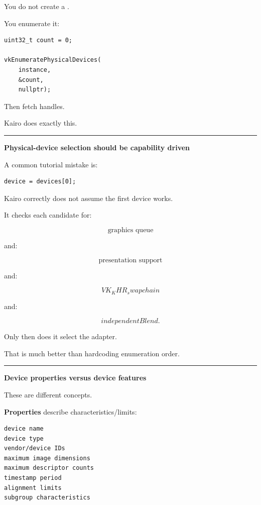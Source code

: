 You do not create a .

You enumerate it:

\begin{verbatim}
uint32_t count = 0;

vkEnumeratePhysicalDevices(
    instance,
    &count,
    nullptr);
\end{verbatim}

Then fetch handles.

Kairo does exactly this.

\begin{center}\rule{0.5\linewidth}{0.5pt}\end{center}

\textbf{Physical-device selection should be capability driven}

A common tutorial mistake is:

\begin{verbatim}
device = devices[0];
\end{verbatim}

Kairo correctly does not assume the first device works.

It checks each candidate for:

\[
\text{graphics queue}
\]

and:

\[
\text{presentation support}
\]

and:

\[
VK_KHR_swapchain
\]

and:

\[
independentBlend.
\]

Only then does it select the adapter.

That is much better than hardcoding enumeration order.

\begin{center}\rule{0.5\linewidth}{0.5pt}\end{center}

\textbf{Device properties versus device features}

These are different concepts.

\textbf{Properties} describe characteristics/limits:

\begin{verbatim}
device name
device type
vendor/device IDs
maximum image dimensions
maximum descriptor counts
timestamp period
alignment limits
subgroup characteristics
\end{verbatim}

